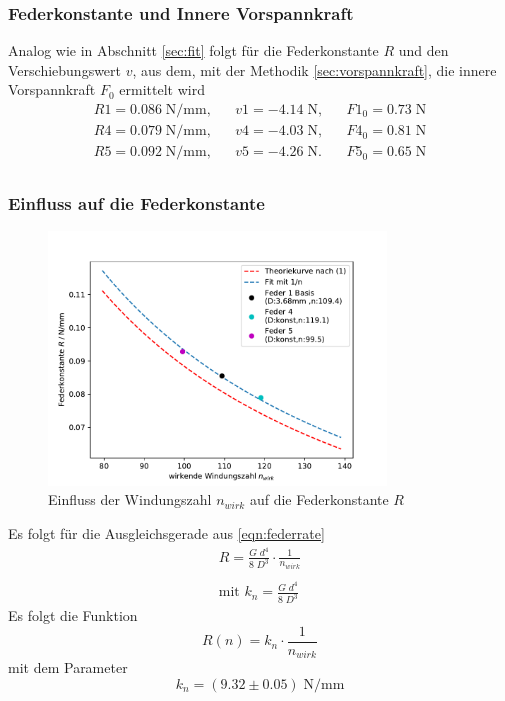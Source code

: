 \subsubsection{Federkonstante und Innere Vorspannkraft}
Analog wie in Abschnitt \ref{sec:fit} folgt für die Federkonstante $R$
und den Verschiebungswert $v$, aus dem, mit der Methodik \ref{sec:vorspannkraft},
die innere Vorspannkraft $F_0$ ermittelt wird
\begin{align*}
  R1= 0.086\;\si{\N\per\mm}, &&  v1= -4.14\;\si{\N}, && F1_0=0.73\;\si{\N}\\
  R4= 0.079\;\si{\N\per\mm}, &&  v4= -4.03\;\si{\N}, && F4_0=0.81\;\si{\N}\\
  R5= 0.092\;\si{\N\per\mm}, &&  v5= -4.26\;\si{\N}. && F5_0=0.65\;\si{\N}\\
\end{align*}


\subsubsection{Einfluss auf die Federkonstante}
\begin{figure}[H]
  \center
  \includegraphics[width=0.8\textwidth]{plots/n_konstante_dia.pdf}
  \caption{Einfluss der Windungszahl $n_{wirk}$ auf die Federkonstante $R$}
  \label{fig:R_n_dia}
\end{figure}
Es folgt für die Ausgleichsgerade aus \ref{eqn:federrate}
\begin{align*}
  R=\frac{G\;d^4}{8\;D^3}\cdot \frac{1}{n_{wirk}} \\\\  
  \text{mit } k_n=\frac{G\;d^4}{8\;D^3}
\end{align*}
Es folgt die Funktion
\begin{equation*}
  R(n)=k_n \cdot \frac{1}{n_{wirk}}
\end{equation*}
mit dem Parameter
\begin{equation*}
  k_n=(9.32 \pm 0.05) \;\si{\N\per\mm}
\end{equation*}


